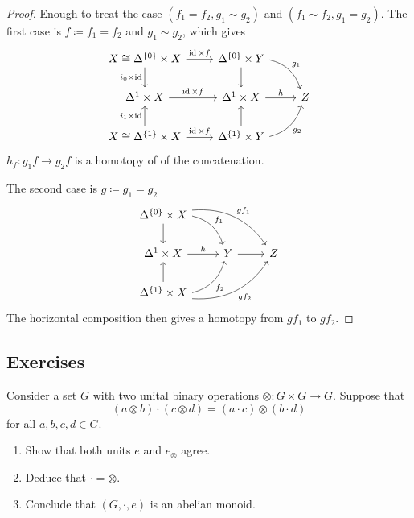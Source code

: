 \begin{proof}
    Enough to treat the case $(f_1 = f_2, g_1 \sim g_2)$ and $(f_1 \sim f_2, g_1 = g_2)$.
    The first case is $f\coloneqq f_1 = f_2$ and $g_1 \sim g_2$, which gives 
    \[
    \begin{tikzcd}
        X  \cong \Delta^{\{0\}} \times X 
        \ar[r, "\id \times f"]
        \ar[d, "i_0 \times \id"']
        &
        \Delta^{\{0\}} \times Y
        \ar[d]
        \ar[rd, bend left, "g_1"]
        &
        \\
        \Delta^1 \times X
        \ar[r, "\id \times f"]
        &
        \Delta^1 \times X
        \ar[r, "h"]
        &
        Z
        \\
        X \cong \Delta^{\{1\}} \times X
        \ar[u, "i_1 \times \id"]
        \ar[r, "\id \times f"]
        &
        \Delta^{\{1\}}\times Y
        \ar[u]
        \ar[ru, bend right, "g_2"']
    \end{tikzcd}
    \]
    $h_f \colon g_1f \to g_2f$ is a homotopy of of the concatenation.

    The second case is $g\coloneqq g_1 = g_2$
    \[
    \begin{tikzcd}
        \Delta^{\{0\}}\times X
        \ar[d]
        \ar[dr, bend left, "f_1"]
        \ar[drr, bend left, "gf_1"]
        \\
        \Delta^1 \times X 
        \ar[r, "h"]
        &
        Y
        \ar[r]
        &
        Z
        \\
        \Delta^{\{1\}} \times X
        \ar[u]
        \ar[ru,bend right, "f_2"']
        \ar[rru,bend right, "gf_2"']
    \end{tikzcd}
    \]
    The horizontal composition then gives a homotopy from $gf_1$ to $gf_2$.
\end{proof}

\subsection{Exercises}

\begin{Exercise}
    
Consider a set $ G $ with two unital binary operations $ \otimes : G \times G \to G $.
Suppose that 
\[
    ( a \otimes b ) \cdot ( c \otimes d ) = ( a \cdot c ) \otimes ( b \cdot d )
\]
for all $ a , b, c , d \in G $.
\begin{enumerate}
    \item 
    Show that both units $e$ and $e_{\otimes}$ agree.

    \item 
    Deduce that $ \cdot = \otimes $.

    \item 
    Conclude that $ ( G , \cdot , e ) $ is an abelian monoid.
\end{enumerate}
\end{Exercise}


